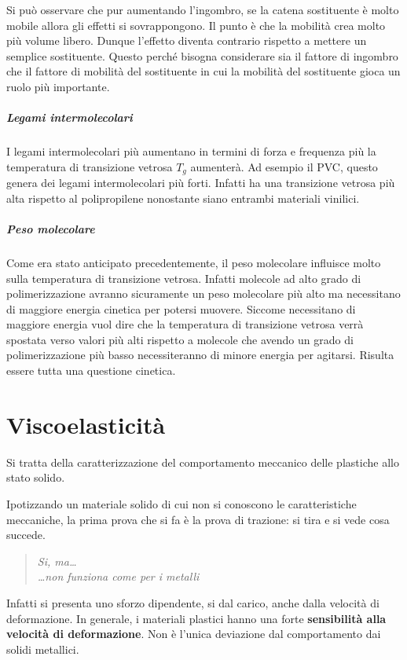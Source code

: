 Si può osservare che pur aumentando l'ingombro, se la catena sostituente è molto mobile allora gli effetti si sovrappongono. Il punto è che la mobilità crea molto più volume libero. Dunque l'effetto diventa contrario rispetto a mettere un semplice sostituente. Questo perché bisogna considerare sia il fattore di ingombro che il fattore di mobilità del sostituente in cui la mobilità del sostituente gioca un ruolo più importante.

\paragraph{Legami intermolecolari}
I legami intermolecolari più aumentano in termini di forza e frequenza più la temperatura di transizione vetrosa $T_g$ aumenterà.
Ad esempio il \ac{PVC}, questo genera dei legami intermolecolari più forti. Infatti ha una transizione vetrosa più alta rispetto al polipropilene nonostante siano entrambi materiali vinilici. 

\paragraph{Peso molecolare}
Come era stato anticipato precedentemente, il peso molecolare influisce molto sulla temperatura di transizione vetrosa. Infatti molecole ad alto grado di polimerizzazione avranno sicuramente un peso molecolare più alto ma necessitano di maggiore energia cinetica per potersi muovere.
Siccome necessitano di maggiore energia vuol dire che la temperatura di transizione vetrosa verrà spostata verso valori più alti rispetto a molecole che avendo un grado di polimerizzazione più basso necessiteranno di minore energia per agitarsi.
Risulta essere tutta una questione cinetica.

\chapter{Viscoelasticità}\label{ch:viscoelasticità}
Si tratta della caratterizzazione del comportamento meccanico delle plastiche allo stato solido.

Ipotizzando un materiale solido di cui non si conoscono le caratteristiche meccaniche, la prima prova che si fa è la prova di trazione: si tira e si vede cosa succede.

\begin{quote}
\emph{Si, ma\dots \\ \dots non funziona come per i metalli}
\end{quote}
Infatti si presenta uno sforzo dipendente, si dal carico, anche dalla velocità di deformazione.
In generale, i materiali plastici hanno una forte \textbf{sensibilità alla velocità di deformazione}.
Non è l'unica deviazione dal comportamento dai solidi metallici.


